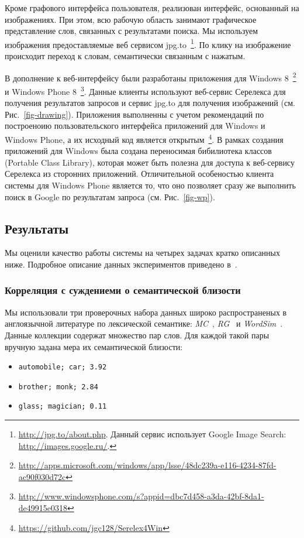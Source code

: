 \documentclass[a4paper,10pt,twoside]{article}
\begin{document}

Кроме графового интерфейса пользователя, реализован интерфейс, основанный на изображениях. При этом, всю рабочую область занимают графическое представление слов, связанных с результатами поиска. Мы используем изображения предоставляемые  веб сервисом jpg.to~\footnote{\url{http://jpg.to/about.php}. Данный сервис использует Google Image Search: \url{http://images.google.ru/}.}. По клику на изображение происходит переход к словам, семантически связанным с нажатым.


В дополнение к веб-интерфейсу были разработаны приложения для Windows 8~\footnote{\url{http://apps.microsoft.com/windows/app/lsse/48dc239a-e116-4234-87fd-ac90f030d72c}} и Windows Phone 8~\footnote{\url{http://www.windowsphone.com/s?appid=dbc7d458-a3da-42bf-8da1-de49915e0318}}. Данные клиенты используют веб-сервис Серелекса для получения результатов запросов и сервис jpg.to для получения изображений (см. Рис.~\ref{fig-drawing}). Приложения выполненны с учетом рекомендаций по построеноию пользовательского интерфейса приложений для Windows и Windows Phone, а их исходный код является открытым~\footnote{\url{https://github.com/jgc128/Serelex4Win}}. В рамках создания приложений для Windows была создана переносимая бибилиотека классов (Portable Class Library), которая может быть полезна для доступа к веб-сервису Серелекса из сторонних приложений. Отличительной особеностью клиента системы для Windows Phone является то, что оно позволяет сразу же выполнить поиск в Google по результатам запроса (см. Рис.~\ref{fig-wp}).



\subsection{Результаты}
Мы оценили качество работы системы на четырех задачах кратко описанных ниже. Подробное описание данных экспериментов  приведено в~\cite{panchenko2012konvens}.  

\subsubsection{Корреляция с суждениеми о семантической близости} Мы использовали три проверочных набора данных широко распространеных в англоязычной литературе по лексической семантике: \textit{MC}~\cite{miller1993semantic}, \textit{RG}~\cite{rubenstein1965} и \textit{WordSim}~\cite{finkelstein2001placing}. Данные коллекции содержат множество пар слов. Для каждой такой пары вручную задана мера их семантической близости:
\begin{itemize}
  \footnotesize
  \item \texttt{automobile; car; 3.92}
  \item \texttt{brother; monk; 2.84}
  \item \texttt{glass; magician; 0.11}
\end{itemize}
\end{document}
